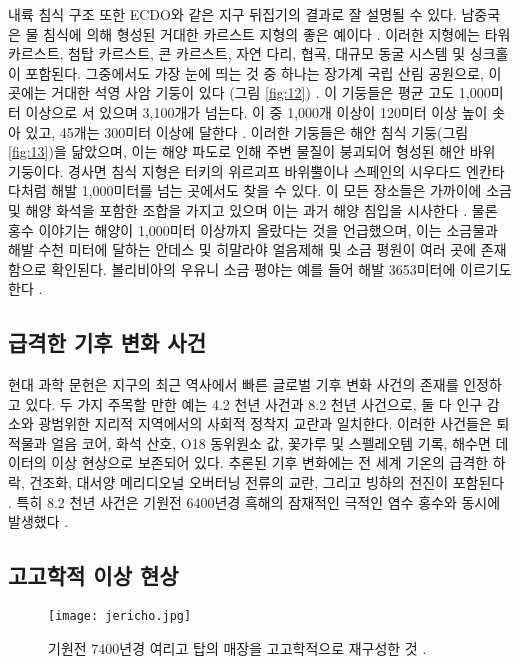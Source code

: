 \documentclass[10pt,twocolumn,letterpaper]{article}
\begin{document}
내륙 침식 구조 또한 ECDO와 같은 지구 뒤집기의 결과로 잘 설명될 수 있다. 남중국은 물 침식에 의해 형성된 거대한 카르스트 지형의 좋은 예이다 \cite{82}. 이러한 지형에는 타워 카르스트, 첨탑 카르스트, 콘 카르스트, 자연 다리, 협곡, 대규모 동굴 시스템 및 싱크홀이 포함된다. 그중에서도 가장 눈에 띄는 것 중 하나는 장가계 국립 산림 공원으로, 이곳에는 거대한 석영 사암 기둥이 있다 (그림 \ref{fig:12}) \cite{84}. 이 기둥들은 평균 고도 1,000미터 이상으로 서 있으며 3,100개가 넘는다. 이 중 1,000개 이상이 120미터 이상 높이 솟아 있고, 45개는 300미터 이상에 달한다 \cite{85}. 이러한 기둥들은 해안 침식 기둥(그림 \ref{fig:13})을 닮았으며, 이는 해양 파도로 인해 주변 물질이 붕괴되어 형성된 해안 바위 기둥이다. 경사면 침식 지형은 터키의 위르괴프 바위뿔이나 스페인의 시우다드 엔칸타다처럼 해발 1,000미터를 넘는 곳에서도 찾을 수 있다. 이 모든 장소들은 가까이에 소금 및 해양 화석을 포함한 조합을 가지고 있으며 이는 과거 해양 침입을 시사한다 \cite{15,86,87}. 물론 홍수 이야기는 \cite{3} 해양이 1,000미터 이상까지 올랐다는 것을 언급했으며, 이는 소금물과 해발 수천 미터에 달하는 안데스 및 히말라야 얼음제해 및 소금 평원이 여러 곳에 존재함으로 확인된다. 볼리비아의 우유니 소금 평야는 예를 들어 해발 3653미터에 이르기도 한다 \cite{94}.

\subsection{급격한 기후 변화 사건}

현대 과학 문헌은 지구의 최근 역사에서 빠른 글로벌 기후 변화 사건의 존재를 인정하고 있다. 두 가지 주목할 만한 예는 4.2 천년 사건과 8.2 천년 사건으로, 둘 다 인구 감소와 광범위한 지리적 지역에서의 사회적 정착지 교란과 일치한다. 이러한 사건들은 퇴적물과 얼음 코어, 화석 산호, O18 동위원소 값, 꽃가루 및 스펠레오템 기록, 해수면 데이터의 이상 현상으로 보존되어 있다. 추론된 기후 변화에는 전 세계 기온의 급격한 하락, 건조화, 대서양 메리디오널 오버터닝 전류의 교란, 그리고 빙하의 전진이 포함된다 \cite{90,91,92}. 특히 8.2 천년 사건은 기원전 6400년경 흑해의 잠재적인 극적인 염수 홍수와 동시에 발생했다 \cite{93}.

\subsection{고고학적 이상 현상}

\begin{figure}[b]
\begin{center}
   \texttt{[image: jericho.jpg]}
\end{center}
   \caption{기원전 7400년경 여리고 탑의 매장을 고고학적으로 재구성한 것 \cite{95}.}
\label{fig:14}
\label{fig:onecol}
\end{figure}
\end{document}
